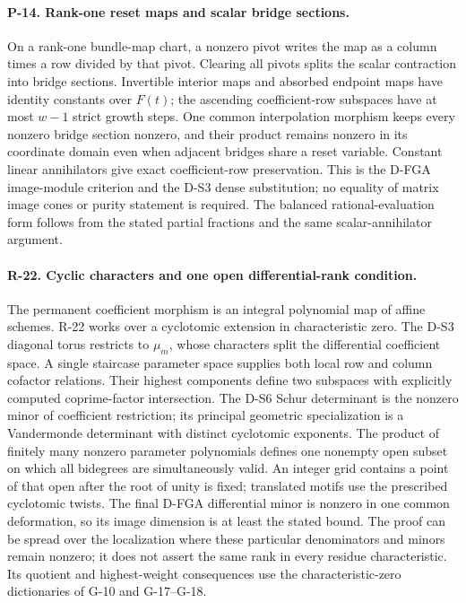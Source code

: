\documentclass[11pt,a4paper]{article}
\theoremstyle{definition}\newtheorem{definition}{Definition}
\begin{document}
\paragraph{P-14. Rank-one reset maps and scalar bridge sections.}
On a rank-one bundle-map chart, a nonzero pivot writes the map as a
column times a row divided by that pivot. Clearing all pivots splits
the scalar contraction into bridge sections. Invertible interior maps
and absorbed endpoint maps have identity constants over $F(t)$; the
ascending coefficient-row subspaces have at most $w-1$ strict growth
steps. One common interpolation morphism keeps every nonzero bridge
section nonzero, and their product remains nonzero in its coordinate
domain even when adjacent bridges share a reset variable. Constant
linear annihilators give exact coefficient-row preservation. This is
the D-FGA image-module criterion and the D-S3 dense substitution; no
equality of matrix image cones or purity statement is required. The
balanced rational-evaluation form follows from the stated partial
fractions and the same scalar-annihilator argument.


\paragraph{R-22. Cyclic characters and one open differential-rank condition.}
The permanent coefficient morphism is an integral polynomial map of
affine schemes. R-22 works over a cyclotomic extension in characteristic
zero. The D-S3 diagonal torus restricts to $\mu_m$, whose characters
split the differential coefficient space. A single staircase parameter
space supplies both local row and column cofactor relations. Their
highest components define two subspaces with explicitly computed
coprime-factor intersection. The D-S6 Schur determinant is the nonzero
minor of coefficient restriction; its principal geometric specialization
is a Vandermonde determinant with distinct cyclotomic exponents.
The product of finitely many nonzero parameter polynomials defines one
nonempty open subset on which all bidegrees are simultaneously valid.
An integer grid contains a point of that open after the root of unity
is fixed; translated motifs use the prescribed cyclotomic twists.
The final D-FGA differential minor is nonzero in one common deformation,
so its image dimension is at least the stated bound. The proof can be
spread over the localization where these particular denominators and
minors remain nonzero; it does not assert the same rank in every residue
characteristic. Its quotient and highest-weight consequences use the
characteristic-zero dictionaries of G-10 and G-17--G-18.
\end{document}
